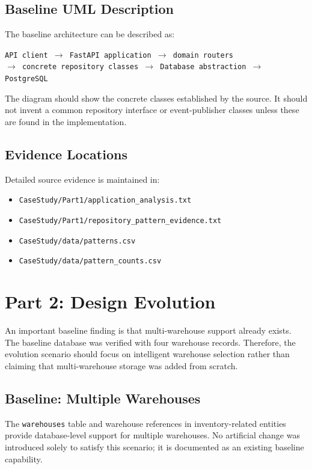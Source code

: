 \documentclass[12pt,a4paper]{article}
\begin{document}
\subsection{Baseline UML Description}
The baseline architecture can be described as:
\begin{center}
\texttt{API client $\rightarrow$ FastAPI application $\rightarrow$ domain routers}\\
\texttt{$\rightarrow$ concrete repository classes $\rightarrow$ Database abstraction $\rightarrow$ PostgreSQL}
\end{center}
The diagram should show the concrete classes established by the source. It should not invent a common repository interface or event-publisher classes unless these are found in the implementation.

\subsection{Evidence Locations}
Detailed source evidence is maintained in:
\begin{itemize}
    \item \texttt{CaseStudy/Part1/application\_analysis.txt}
    \item \texttt{CaseStudy/Part1/repository\_pattern\_evidence.txt}
    \item \texttt{CaseStudy/data/patterns.csv}
    \item \texttt{CaseStudy/data/pattern\_counts.csv}
\end{itemize}

\section{Part 2: Design Evolution}
An important baseline finding is that multi-warehouse support already exists. The baseline database was verified with four warehouse records. Therefore, the evolution scenario should focus on intelligent warehouse selection rather than claiming that multi-warehouse storage was added from scratch.

\subsection{Baseline: Multiple Warehouses}
The \texttt{warehouses} table and warehouse references in inventory-related entities provide database-level support for multiple warehouses. No artificial change was introduced solely to satisfy this scenario; it is documented as an existing baseline capability.
\end{document}
